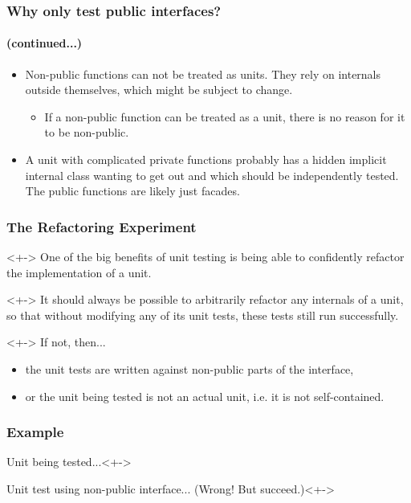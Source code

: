 \begin{frame}
	\frametitle{Why only test public interfaces?}
	\framesubtitle{(continued...)}

	\begin{itemize}[<+-| highlight@+>]
		\item Non-public functions can not be treated as units. They rely on internals outside themselves, which might be subject to change.
		\begin{itemize}[<+-| highlight@+>]
			\item If a non-public function can be treated as a unit, there is no reason for it to be non-public.
		\end{itemize}
		\item A unit with complicated private functions probably has a hidden implicit internal class wanting to get out and which should be independently tested. The public functions are likely just facades.
	\end{itemize}
\end{frame}


\begin{frame}
	\frametitle{The Refactoring Experiment}

	\begin{block}{}<+->
		One of the big benefits of unit testing is being able to confidently refactor the implementation of a unit.
	\end{block}

	\begin{block}{}<+->
		It should always be possible to arbitrarily refactor any internals of a unit, so that without modifying any of its unit tests, these tests still run successfully.
	\end{block}

	\begin{block}{}<+->
		If not, then...
		\begin{itemize}[<+-| highlight@+>]
			\item the unit tests are written against non-public parts of the interface,
			\item or the unit being tested is not an actual unit, i.e. it is not self-contained.
		\end{itemize}
	\end{block}
\end{frame}


\begin{frame}
	\frametitle{Example}
	\begin{block}{Unit being tested...}<+->
		
	\end{block}
	\begin{block}{Unit test using non-public interface... (Wrong! But succeed.)}<+->
		
	\end{block}
\end{frame}


